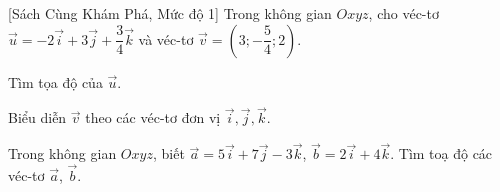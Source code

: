 \begin{bt}%
[Sách Cùng Khám Phá, Mức độ 1]%
	Trong không gian $Oxyz$, cho véc-tơ $\overrightarrow{u}=-2 \overrightarrow{i}+3 \overrightarrow{j}+\dfrac{3}{4} \overrightarrow{k}$ và véc-tơ $\overrightarrow{v}=\left(3;-\dfrac{5}{4}; 2\right)$.
	\begin{listEX}[1]
		\item Tìm tọa độ của $\overrightarrow{u}$.
		\item Biểu diễn $\overrightarrow{v}$ theo các véc-tơ đơn vị $\overrightarrow{i}, \overrightarrow{j}, \overrightarrow{k}$.
	\end{listEX}
\end{bt}

\begin{bt}%
	Trong không gian $Oxyz$, biết $\overrightarrow{a}=5\overrightarrow{i}+7\overrightarrow{j}-3\overrightarrow{k}$, $\overrightarrow{b}=2\overrightarrow{i}+4\overrightarrow{k}$. Tìm toạ độ các véc-tơ $\overrightarrow{a}$, $\overrightarrow{b}$.
\end{bt}

